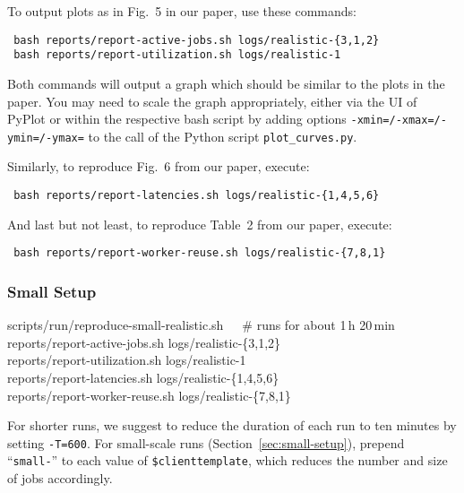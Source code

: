 \documentclass[runningheads]{article}
\numberwithin{dummy}{subsection}
\begin{document}
To output plots as in Fig.~5 in our paper, use these commands:
\begin{verbatim}
 bash reports/report-active-jobs.sh logs/realistic-{3,1,2}
 bash reports/report-utilization.sh logs/realistic-1
\end{verbatim}
Both commands will output a graph which should be similar to the plots in the paper.
You may need to scale the graph appropriately, either via the UI of PyPlot or within the respective bash script by adding options \texttt{-xmin=/-xmax=/-ymin=/-ymax=} to the call of the Python script \texttt{plot\_curves.py}.

Similarly, to reproduce Fig.~6 from our paper, execute:
\begin{verbatim}
 bash reports/report-latencies.sh logs/realistic-{1,4,5,6}
\end{verbatim}

And last but not least, to reproduce Table~2 from our paper, execute:
\begin{verbatim}
 bash reports/report-worker-reuse.sh logs/realistic-{7,8,1}
\end{verbatim}


\subsubsection{Small Setup}

\begin{tcolorbox}[
  colback=Magenta!5!white,
  colframe=Magenta!75!black,
  title={\centering In a Nutshell: Commands for Small Setup (Section~\ref{sec:small-setup})}]
\begin{ttfenvcompact}
scripts/run/reproduce-small-realistic.sh\ \ \ \# runs for about 1\,h 20\,min\\
reports/report-active-jobs.sh logs/realistic-\{3,1,2\}\\
reports/report-utilization.sh logs/realistic-1\\
reports/report-latencies.sh logs/realistic-\{1,4,5,6\}\\
reports/report-worker-reuse.sh logs/realistic-\{7,8,1\}
\end{ttfenvcompact}
\end{tcolorbox}

For shorter runs, we suggest to reduce the duration of each run to ten minutes by setting \texttt{-T=600}.
For small-scale runs (Section~\ref{sec:small-setup}), prepend ``\texttt{small-}'' to each value of \texttt{\$clienttemplate}, which reduces the number and size of jobs accordingly.
\end{document}
